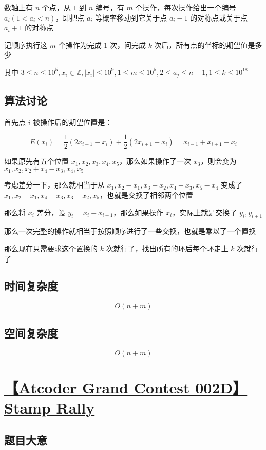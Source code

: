 \documentclass[UTF8]{article}
\begin{document}
数轴上有 $n$ 个点，从 $1$ 到 $n$ 编号，有 $m$ 个操作，每次操作给出一个编号 $a_i(1<a_i<n)$，即把点 $a_i$ 等概率移动到它关于点 $a_i−1$ 的对称点或关于点 $a_i+1$ 的对称点

记顺序执行这 $m$ 个操作为完成 $1$ 次，问完成 $k$ 次后，所有点的坐标的期望值是多少

其中 $3 \le n \le 10^5,x_i \in \mathbb{Z},|x_i| \le 10^9,1 \le m \le 10^5,2 \le a_j \le n-1,1 \le k \le 10^{18}$

\subsection{算法讨论}

首先点 $i$ 被操作后的期望位置是：

$$
E(x_i)=\frac{1}{2}\left(2x_{i-1}-x_i\right)+\frac{1}{2}\left(2x_{i+1}-x_i\right)=x_{i-1}+x_{i+1}-x_{i}
$$

如果原先有五个位置 $x_1, x_2, x_3, x_4, x_5$，那么如果操作了一次 $x_3$，则会变为 $x_1, x_2, x_2+x_4-x_3, x_4, x_5$

考虑差分一下，那么就相当于从 $x_1, x_2-x_1, x_3-x_2, x_4-x_3, x_5-x_4$ 变成了 $x_1, x_2-x_1, x_4-x_3, x_3-x_2, x_5$，也就是交换了相邻两个位置

那么将 $x_i$ 差分，设 $y_i=x_i-x_{i-1}$，那么如果操作 $x_i$，实际上就是交换了 $y_i, y_{i+1}$

那么一次完整的操作就相当于按照顺序进行了一些交换，也就是乘以了一个置换

那么现在只需要求这个置换的 $k$ 次就行了，找出所有的环后每个环走上 $k$ 次就行了

\subsection{时间复杂度}

$$
O(n+m)
$$

\subsection{空间复杂度}

$$
O(n+m)
$$

\section{\href{https://agc002.contest.atcoder.jp/tasks/agc002_d}{【Atcoder Grand Contest 002D】Stamp Rally}}

\subsection{题目大意}
\end{document}

